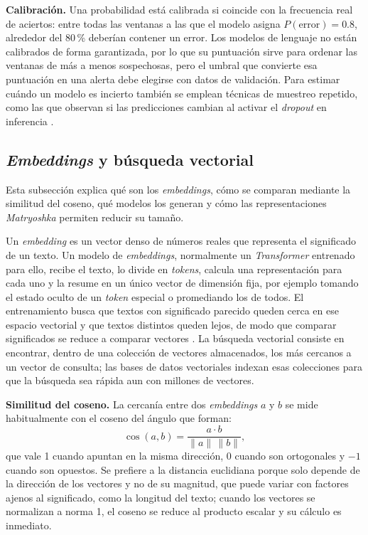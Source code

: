 \textbf{Calibración.} Una probabilidad está calibrada si coincide con la frecuencia real de aciertos: entre todas las ventanas a las que el modelo asigna $P(\text{error}) = 0.8$, alrededor del 80\,\% deberían contener un error. Los modelos de lenguaje no están calibrados de forma garantizada, por lo que su puntuación sirve para ordenar las ventanas de más a menos sospechosas, pero el umbral que convierte esa puntuación en una alerta debe elegirse con datos de validación. Para estimar cuándo un modelo es incierto también se emplean técnicas de muestreo repetido, como las que observan si las predicciones cambian al activar el \textit{dropout} en inferencia \cite{ma2026_adaptivelog}.

\subsection{\textit{Embeddings} y búsqueda vectorial}\label{sec:mt_embeddings}

Esta subsección explica qué son los \textit{embeddings}, cómo se comparan mediante la similitud del coseno, qué modelos los generan y cómo las representaciones \textit{Matryoshka} permiten reducir su tamaño.

Un \textit{embedding} es un vector denso de números reales que representa el significado de un texto. Un modelo de \textit{embeddings}, normalmente un \textit{Transformer} entrenado para ello, recibe el texto, lo divide en \textit{tokens}, calcula una representación para cada uno y la resume en un único vector de dimensión fija, por ejemplo tomando el estado oculto de un \textit{token} especial o promediando los de todos. El entrenamiento busca que textos con significado parecido queden cerca en ese espacio vectorial y que textos distintos queden lejos, de modo que comparar significados se reduce a comparar vectores \cite{murphy2024_embeddings}. La búsqueda vectorial consiste en encontrar, dentro de una colección de vectores almacenados, los más cercanos a un vector de consulta; las bases de datos vectoriales indexan esas colecciones para que la búsqueda sea rápida aun con millones de vectores.

\textbf{Similitud del coseno.} La cercanía entre dos \textit{embeddings} $a$ y $b$ se mide habitualmente con el coseno del ángulo que forman:
\begin{equation}
\cos(a, b) = \frac{a \cdot b}{\lVert a \rVert \, \lVert b \rVert},
\end{equation}
que vale 1 cuando apuntan en la misma dirección, 0 cuando son ortogonales y $-1$ cuando son opuestos. Se prefiere a la distancia euclidiana porque solo depende de la dirección de los vectores y no de su magnitud, que puede variar con factores ajenos al significado, como la longitud del texto; cuando los vectores se normalizan a norma 1, el coseno se reduce al producto escalar y su cálculo es inmediato.

